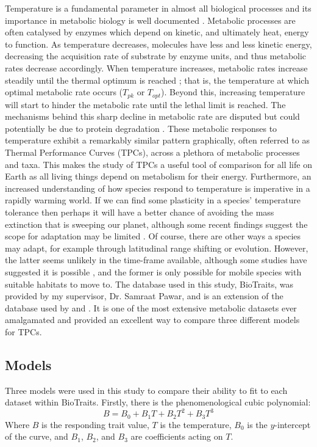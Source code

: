\documentclass[twoside,twocolumn,11pt]{article}
\begin{document}
Temperature is a fundamental parameter in
almost all biological processes and its importance in metabolic biology is well 
documented \citep{Brown2004, Montoya2012, Dell2011,DeLong2017}. 
Metabolic processes are often catalysed by enzymes
which depend on kinetic, and ultimately heat, energy to function. As temperature
decreases, molecules have less and less kinetic energy, decreasing the acquisition rate of 
substrate by enzyme units, and thus metabolic rates
decrease accordingly. When temperature increases, metabolic rates increase steadily
until the thermal optimum is reached  \citep{DeLong2017, Dell2011}; that is, the temperature at which optimal
metabolic rate occurs ($T_{pk}$ or $T_{opt}$). Beyond this, increasing temperature
will start to hinder the metabolic rate until the lethal limit is reached. The mechanisms
behind this sharp decline in metabolic rate are disputed but could potentially be
due to protein degradation \citep{Johnson1946, Dell2011}. These metabolic responses 
to temperature exhibit a remarkably similar pattern graphically, often referred to as Thermal 
Performance Curves (TPCs), across a plethora of metabolic processes and taxa. This 
makes the study of TPCs a useful tool of comparison for all life on Earth as all
living things depend on metabolism for their energy. Furthermore, an increased understanding
of how species respond to temperature is imperative in a rapidly warming world. 
If we can find some plasticity in a species' temperature tolerance then perhaps it will
have a better chance of avoiding the mass extinction that is sweeping our planet,
although some recent findings suggest the scope for adaptation may be limited \citep{Tuzun2018}.
Of course, there are other ways a species may adapt, for example through latitudinal range shifting \citep{Haase2019}
or evolution. However, the latter seems unlikely in the time-frame available, although some 
studies have suggested it is possible \citep{DeLong2018}, and the former
is only possible for mobile species with suitable habitats to move to.
The database used in this study, BioTraits, was provided by my supervisor,
Dr. Samraat Pawar, and is an extension of the database used by \cite{Dell2011} and \cite{Kontopoulos2018}. It 
is one of the most extensive metabolic datasets ever amalgamated and provided an excellent
way to compare three different models for TPCs.

\subsection{Models}
Three models were used in this study to compare their ability to fit to each dataset within BioTraits.
Firstly, there is the phenomenological cubic polynomial:
\begin{equation}
B = B_0 + B_1T + B_2T^2 + B_3T^3
\end{equation}
Where $B$ is the responding trait value, $T$ is the temperature, $B_0$ is the $y$-intercept of the 
curve, and $B_1$, $B_2$, and $B_3$ are coefficients acting on $T$.
\end{document}
